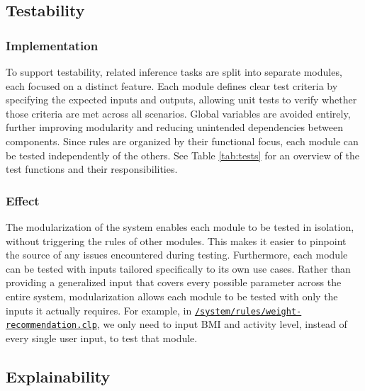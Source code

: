 \documentclass{article}
\begin{document}
\subsection{ Testability}
    
\subsubsection{Implementation}

To support testability, related inference tasks are split into separate modules, each focused on a distinct feature. Each module defines clear test criteria by specifying the expected inputs and outputs, allowing unit tests to verify whether those criteria are met across all scenarios. Global variables are avoided entirely, further improving modularity and reducing unintended dependencies between components.
Since rules are organized by their functional focus, each module can be tested independently of the others. See Table \ref{tab:tests} for an overview of the test functions and their responsibilities.

\subsubsection{Effect}
The modularization of the system enables each module to be tested in isolation, without triggering the rules of other modules. This makes it easier to pinpoint the source of any issues encountered during testing. Furthermore, each module can be tested with inputs tailored specifically to its own use cases. Rather than providing a generalized input that covers every possible parameter across the entire system, modularization allows each module to be tested with only the inputs it actually requires. For example, in \href{https://github.com/joshpham97/COMP474Project_OptionB_PhamTran_ExerciseRecommender/blob/main/system/rules/weight-recommendation.clp}{\texttt{/system/rules/weight-recommendation.clp}}, we only need to input BMI and activity level, instead of every single user input, to test that module. 
\subsection{Explainability}
\end{document}
